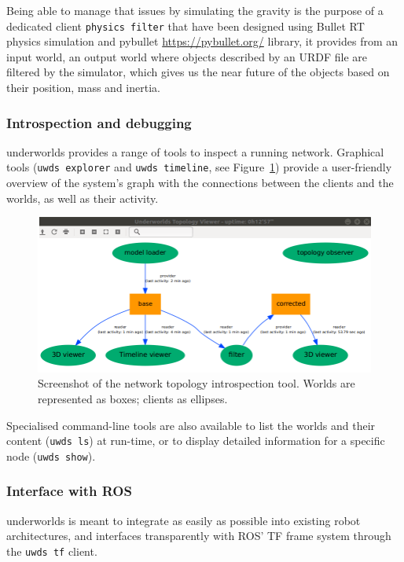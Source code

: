 \documentclass[letterpaper, 10pt, conference]{ieeeconf}
\newcommand{\uwds}{{\sc underworlds}\xspace}
\begin{document}
Being able to manage that issues by simulating the gravity is the purpose of a dedicated client  
{\tt physics filter} that have been designed using Bullet RT physics simulation and pybullet \url{https://pybullet.org/} library, it provides from an input world, an output world where objects described by an URDF file are filtered by the simulator, which gives us the near future of the objects based on their position, mass and inertia.

\subsubsection{Introspection and debugging}

\uwds provides a range of tools to inspect a running network. Graphical
tools ({\tt uwds explorer} and {\tt uwds timeline}, see Figure~\ref{fig|explorer})
provide a user-friendly overview of the system's graph with the connections
between the clients and the worlds, as well as their activity.

\begin{figure}
    \centering
    \includegraphics[width=\linewidth]{tools}
    \caption{Screenshot of the network topology introspection tool. Worlds are represented as boxes; clients as ellipses.}
    \label{fig|explorer}
\end{figure}

Specialised command-line tools are also available to list the worlds
and their content ({\tt uwds ls}) at run-time, or to display detailed information for a
specific node ({\tt uwds show}).

\subsubsection{Interface with ROS}

\uwds is meant to integrate as easily as possible into existing robot
architectures, and interfaces transparently with ROS' TF frame system through
the {\tt uwds tf} client.
\end{document}
